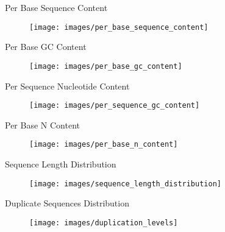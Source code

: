 \begin{frame}{Per Base Sequence Content}

\begin{figure}[htbp]
\centering
\texttt{[image: images/per\_base\_sequence\_content]}
\caption{}
\end{figure}

\end{frame}

\begin{frame}{Per Base GC Content}

\begin{figure}[htbp]
\centering
\texttt{[image: images/per\_base\_gc\_content]}
\caption{}
\end{figure}

\end{frame}

\begin{frame}{Per Sequence Nucleotide Content}

\begin{figure}[htbp]
\centering
\texttt{[image: images/per\_sequence\_gc\_content]}
\caption{}
\end{figure}

\end{frame}

\begin{frame}{Per Base N Content}

\begin{figure}[htbp]
\centering
\texttt{[image: images/per\_base\_n\_content]}
\caption{}
\end{figure}

\end{frame}

\begin{frame}{Sequence Length Distribution}

\begin{figure}[htbp]
\centering
\texttt{[image: images/sequence\_length\_distribution]}
\caption{}
\end{figure}

\end{frame}

\begin{frame}{Duplicate Sequences Distribution}

\begin{figure}[htbp]
\centering
\texttt{[image: images/duplication\_levels]}
\caption{}
\end{figure}

\end{frame}

